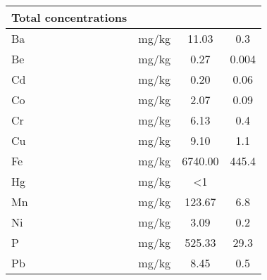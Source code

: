 \begin{table}
\begin{tabular}{lccc}
\textbf{Total concentrations} & \multicolumn{1}{l}{\textbf{}} & \multicolumn{1}{l}{\textbf{}} & \multicolumn{1}{l}{\textbf{}} \\ \hline \addlinespace
Ba                            & mg/kg                         & 11.03                         & 0.3                           \\
Be                            & mg/kg                         & 0.27                          & 0.004                         \\
Cd                            & mg/kg                         & 0.20                          & 0.06                          \\
Co                            & mg/kg                         & 2.07                          & 0.09                          \\
Cr                            & mg/kg                         & 6.13                          & 0.4                           \\
Cu                            & mg/kg                         & 9.10                          & 1.1                           \\
Fe                            & mg/kg                         & 6740.00                       & 445.4                         \\
Hg                            & mg/kg                      & \textless{}1                  &                               \\
Mn                            & mg/kg                      & 123.67                        & 6.8                           \\
Ni                            & mg/kg                      & 3.09                          & 0.2                           \\
P                             & mg/kg                      & 525.33                        & 29.3                          \\
Pb                            & mg/kg                      & 8.45                          & 0.5       \\ \bottomrule          
\end{tabular}
\end{table}